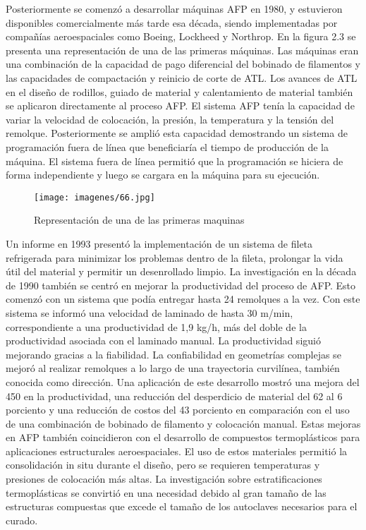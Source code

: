 Posteriormente se comenzó a desarrollar máquinas AFP en 1980, y estuvieron disponibles comercialmente más tarde esa década, siendo implementadas por compañías aeroespaciales como Boeing, Lockheed y Northrop. En la figura 2.3 se presenta una representación de una de las primeras máquinas. Las máquinas eran una combinación de la capacidad de pago diferencial del bobinado de filamentos y las capacidades de compactación y reinicio de corte de ATL. Los avances de ATL en el diseño de rodillos, guiado de material y calentamiento de material también se aplicaron directamente al proceso AFP. El sistema AFP tenía la capacidad de variar la velocidad de colocación, la presión, la temperatura y la tensión del remolque. Posteriormente se amplió esta capacidad demostrando un sistema de programación fuera de línea que beneficiaría el tiempo de producción de la máquina. El sistema fuera de línea permitió que la programación se hiciera de forma independiente y luego se cargara en la máquina para su ejecución.
\begin{figure}[H]
\begin{center}
\texttt{[image: imagenes/66.jpg]}
\caption{Representación de una de las primeras maquinas}
\label{afp}
\end{center}
\end{figure}
 Un informe en 1993 presentó la implementación de un sistema de fileta refrigerada para minimizar los problemas dentro de la fileta, prolongar la vida útil del material y permitir un desenrollado limpio. La investigación en la década de 1990 también se centró en mejorar la productividad del proceso de AFP. Esto comenzó con un sistema que podía entregar hasta 24 remolques a la vez. Con este sistema se informó una velocidad de laminado de hasta 30 m/min, correspondiente a una productividad de 1,9 kg/h, más del doble de la productividad asociada con el laminado manual. La productividad siguió mejorando gracias a la fiabilidad. La confiabilidad en geometrías complejas se mejoró al realizar remolques a lo largo de una trayectoria curvilínea, también conocida como dirección. Una aplicación de este desarrollo mostró una mejora del 450 en la productividad, una reducción del desperdicio de material del 62 al 6 porciento y una reducción de costos del 43 porciento en comparación con el uso de una combinación de bobinado de filamento y colocación manual. Estas mejoras en AFP también coincidieron con el desarrollo de compuestos termoplásticos para aplicaciones estructurales aeroespaciales. El uso de estos materiales permitió la consolidación in situ durante el diseño, pero se requieren temperaturas y presiones de colocación más altas. La investigación sobre estratificaciones termoplásticas se convirtió en una necesidad debido al gran tamaño de las estructuras compuestas que excede el tamaño de los autoclaves necesarios para el curado.

